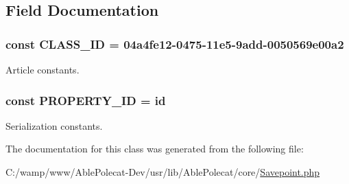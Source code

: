 \subsection{Field Documentation}
\hypertarget{class_able_polecat___savepoint_ade806874ef80d8220f2d79c15884122d}{}
\subsubsection[{C\+L\+A\+S\+S\+\_\+\+I\+D}]{\setlength{\rightskip}{0pt plus 5cm}const C\+L\+A\+S\+S\+\_\+\+I\+D = \textquotesingle{}04a4fe12-\/0475-\/11e5-\/9add-\/0050569e00a2\textquotesingle{}}\label{class_able_polecat___savepoint_ade806874ef80d8220f2d79c15884122d}
Article constants. \hypertarget{class_able_polecat___savepoint_a693979d85f1f89b2d1d1d6832d906efe}{}
\subsubsection[{P\+R\+O\+P\+E\+R\+T\+Y\+\_\+\+I\+D}]{\setlength{\rightskip}{0pt plus 5cm}const P\+R\+O\+P\+E\+R\+T\+Y\+\_\+\+I\+D = \textquotesingle{}id\textquotesingle{}}\label{class_able_polecat___savepoint_a693979d85f1f89b2d1d1d6832d906efe}
Serialization constants. 

The documentation for this class was generated from the following file\+:\begin{DoxyCompactItemize}
\item 
C\+:/wamp/www/\+Able\+Polecat-\/\+Dev/usr/lib/\+Able\+Polecat/core/\hyperlink{_savepoint_8php}{Savepoint.\+php}\end{DoxyCompactItemize}

